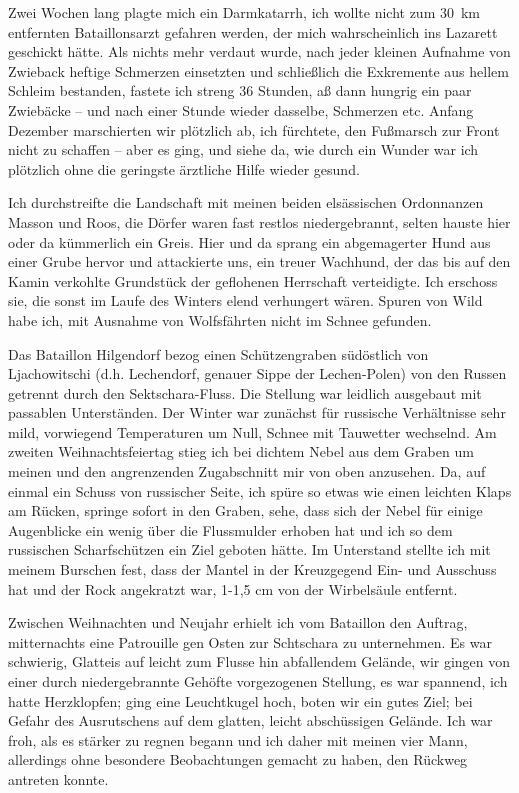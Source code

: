 Zwei Wochen lang plagte mich ein Darmkatarrh, ich wollte nicht zum 30~km entfernten Bataillonsarzt gefahren werden, der mich wahrscheinlich ins Lazarett geschickt hätte. Als nichts mehr verdaut wurde, nach jeder kleinen Aufnahme von Zwieback heftige Schmerzen einsetzten und schließlich die Exkremente aus hellem Schleim bestanden, fastete ich streng 36 Stunden, aß dann hungrig ein paar Zwiebäcke -- und nach einer Stunde wieder dasselbe, Schmerzen etc. Anfang Dezember marschierten wir plötzlich ab, ich fürchtete, den Fußmarsch zur Front nicht zu schaffen -- aber es ging, und siehe da, wie durch ein Wunder war ich plötzlich ohne die geringste ärztliche Hilfe wieder gesund.

Ich durchstreifte die Landschaft mit meinen beiden elsässischen Ordonnanzen Masson und Roos, die Dörfer waren fast restlos niedergebrannt, selten hauste hier oder da kümmerlich ein Greis. Hier und da sprang ein abgemagerter Hund aus einer Grube hervor und attackierte uns, ein treuer Wachhund, der das bis auf den Kamin verkohlte Grundstück der geflohenen Herrschaft verteidigte. Ich erschoss sie, die sonst im Laufe des Winters elend verhungert wären. Spuren von Wild habe ich, mit Ausnahme von Wolfsfährten nicht im Schnee gefunden.

Das Bataillon Hilgendorf bezog einen Schützengraben südöstlich von Ljachowitschi (d.h. Lechendorf, genauer Sippe der Lechen-Polen) von den Russen getrennt durch den Sektschara-Fluss. Die Stellung war leidlich ausgebaut mit passablen Unterständen. Der Winter war zunächst für russische Verhältnisse sehr mild, vorwiegend Temperaturen um Null, Schnee mit Tauwetter wechselnd. Am zweiten Weihnachtsfeiertag stieg ich bei dichtem Nebel aus dem Graben um meinen und den angrenzenden Zugabschnitt mir von oben anzusehen. Da, auf einmal ein Schuss von russischer Seite, ich spüre so etwas wie einen leichten Klaps am Rücken, springe sofort in den Graben, sehe, dass sich der Nebel für einige Augenblicke ein wenig über die Flussmulder erhoben hat und ich so dem russischen Scharfschützen ein Ziel geboten hätte. Im Unterstand stellte ich mit meinem Burschen fest, dass der Mantel in der Kreuzgegend Ein- und Ausschuss hat und der Rock angekratzt war, 1-1,5 cm von der Wirbelsäule entfernt.

Zwischen Weihnachten und Neujahr erhielt ich vom Bataillon den Auftrag, mitternachts eine Patrouille gen Osten zur Schtschara zu unternehmen. Es war schwierig, Glatteis auf leicht zum Flusse hin abfallendem Gelände, wir gingen von einer durch niedergebrannte Gehöfte vorgezogenen Stellung, es war spannend, ich hatte Herzklopfen; ging eine Leuchtkugel hoch, boten wir ein gutes Ziel; bei Gefahr des Ausrutschens auf dem glatten, leicht abschüssigen Gelände. Ich war froh, als es stärker zu regnen begann und ich daher mit meinen vier Mann, allerdings ohne besondere Beobachtungen gemacht zu haben, den Rückweg antreten konnte.

